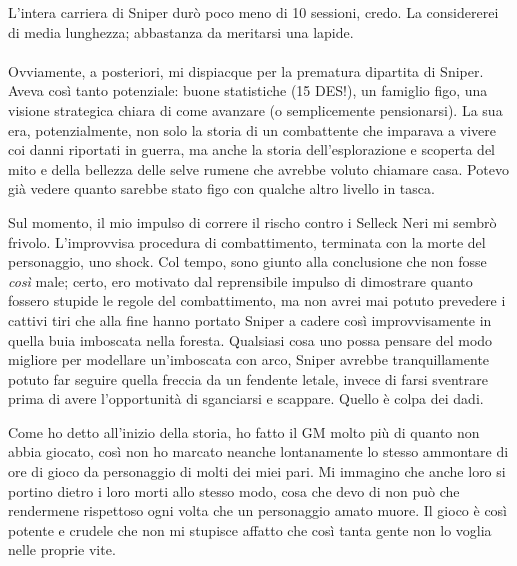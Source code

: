 L'intera carriera di Sniper durò poco meno di 10 sessioni, credo. La considererei di media lunghezza; abbastanza da meritarsi una lapide.
\\
\\
Ovviamente, a posteriori, mi dispiacque per la prematura dipartita di Sniper. Aveva così tanto potenziale: buone statistiche (15 DES!), un famiglio figo, una visione strategica chiara di come avanzare (o semplicemente pensionarsi). La sua era, potenzialmente, non solo la storia di un combattente che imparava a vivere coi danni riportati in guerra, ma anche la storia dell'esplorazione e scoperta del mito e della bellezza delle selve rumene che avrebbe voluto chiamare casa. Potevo già vedere quanto sarebbe stato figo con qualche altro livello in tasca.

Sul momento, il mio impulso di correre il rischo contro i Selleck Neri mi sembrò frivolo. L'improvvisa procedura di combattimento, terminata con la morte del personaggio, uno shock. Col tempo, sono giunto alla conclusione che non fosse \textit{così} male; certo, ero motivato dal reprensibile impulso di dimostrare quanto fossero stupide le regole del combattimento, ma non avrei mai potuto prevedere i cattivi tiri che alla fine hanno portato Sniper a cadere così improvvisamente in quella buia imboscata nella foresta. Qualsiasi cosa uno possa pensare del modo migliore per modellare un'imboscata con arco, Sniper avrebbe tranquillamente potuto far seguire quella freccia da un fendente letale, invece di farsi sventrare prima di avere l'opportunità di sganciarsi e scappare. Quello è colpa dei dadi.

Come ho detto all'inizio della storia, ho fatto il GM molto più di quanto non abbia giocato, così non ho marcato neanche lontanamente lo stesso ammontare di ore di gioco da personaggio di molti dei miei pari. Mi immagino che anche loro si portino dietro i loro morti allo stesso modo, cosa che devo di non può che rendermene rispettoso ogni volta che un personaggio amato muore. Il gioco è così potente e crudele che non mi stupisce affatto che così tanta gente non lo voglia nelle proprie vite.
